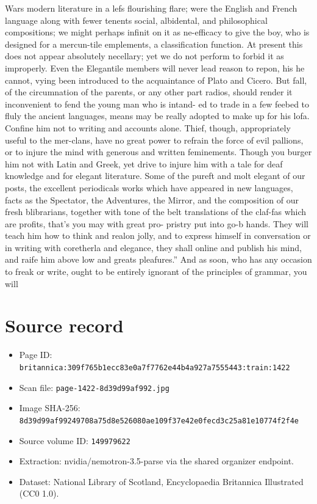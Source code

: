 \documentclass{article}
\begin{document}
Wars modern literature in a lefs flourishing flare; were the English and French language along with fewer tenents social, albidental, and philosophical compositions; we might perhaps infinit on it as ne-efficacy to give the boy, who is designed for a mercun-tile emplements, a classification function. At present this does not appear absolutely necellary; yet we do not perform to forbid it as improperly. Even the Elegantile members will never lead reason to repon, his he cannot, vying been introduced to the acquaintance of Plato and Cicero. But fall, of the circumnation of the parents, or any other part radios, should render it inconvenient to fend the young man who is intand- ed to trade in a few feebed to fluly the ancient languages, means may be really adopted to make up for his lofa. Confine him not to writing and accounts alone. Thief, though, appropriately useful to the mer-clans, have no great power to refrain the force of evil pallions, or to injure the mind with generous and written feminements. Though you burger him not with Latin and Greek, yet drive to injure him with a tale for deaf knowledge and for elegant literature. Some of the pureft and molt elegant of our posts, the excellent periodicals works which have appeared in new languages, facts as the Spectator, the Adventures, the Mirror, and the composition of our fresh blibrarians, together with tone of the belt translations of the claf-fas which are profits, that’s you may with great pro- pristry put into go-b hands. They will teach him how to think and realon jolly, and to express himself in conversation or in writing with coretherla and elegance, they shall online and publish his mind, and raife him above low and greats pleafures.” And as soon, who has any occasion to freak or write, ought to be entirely ignorant of the principles of grammar, you will

\section*{Source record}
\begin{itemize}
\item Page ID: \texttt{britannica:309f765b1ecc83e0a7f7762e44b4a927a7555443:train:1422}
\item Scan file: \texttt{page-1422-8d39d99af992.jpg}
\item Image SHA-256: \texttt{8d39d99af99249708a75d8e526080ae109f37e42e0fecd3c25a81e10774f2f4e}
\item Source volume ID: \texttt{149979622}
\item Extraction: nvidia/nemotron-3.5-parse via the shared organizer endpoint.
\item Dataset: National Library of Scotland, Encyclopaedia Britannica Illustrated (CC0 1.0).
\end{itemize}
\end{document}
